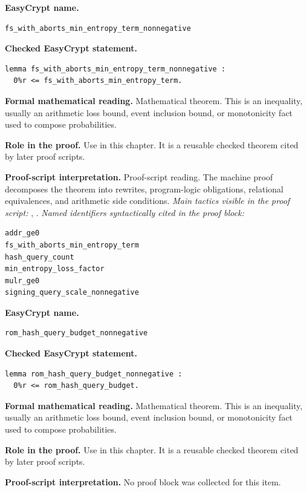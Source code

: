 \begin{formaltheorem}
\noindent\textbf{EasyCrypt name.}
\begin{lstlisting}[language=EasyCrypt,basicstyle=\ttfamily\scriptsize]
fs_with_aborts_min_entropy_term_nonnegative
\end{lstlisting}
\noindent\textbf{Checked EasyCrypt statement.}
\begin{lstlisting}[language=EasyCrypt,basicstyle=\ttfamily\scriptsize]
lemma fs_with_aborts_min_entropy_term_nonnegative :
  0%r <= fs_with_aborts_min_entropy_term.
\end{lstlisting}
\noindent\textbf{Formal mathematical reading.}
Mathematical theorem. This is an inequality, usually an arithmetic loss bound, event inclusion bound, or monotonicity fact used to compose probabilities.

\noindent\textbf{Role in the proof.}
Use in this chapter. It is a reusable checked theorem cited by later proof scripts.

\noindent\textbf{Proof-script interpretation.}
Proof-script reading. The machine proof decomposes the theorem into rewrites, program-logic obligations, relational equivalences, and arithmetic side conditions.
\emph{Main tactics visible in the proof script:} , .
\emph{Named identifiers syntactically cited in the proof block:}
\begin{lstlisting}[language=EasyCrypt,basicstyle=\ttfamily\scriptsize]
addr_ge0
fs_with_aborts_min_entropy_term
hash_query_count
min_entropy_loss_factor
mulr_ge0
signing_query_scale_nonnegative
\end{lstlisting}

\end{formaltheorem}

\begin{formaltheorem}
\noindent\textbf{EasyCrypt name.}
\begin{lstlisting}[language=EasyCrypt,basicstyle=\ttfamily\scriptsize]
rom_hash_query_budget_nonnegative
\end{lstlisting}
\noindent\textbf{Checked EasyCrypt statement.}
\begin{lstlisting}[language=EasyCrypt,basicstyle=\ttfamily\scriptsize]
lemma rom_hash_query_budget_nonnegative :
  0%r <= rom_hash_query_budget.
\end{lstlisting}
\noindent\textbf{Formal mathematical reading.}
Mathematical theorem. This is an inequality, usually an arithmetic loss bound, event inclusion bound, or monotonicity fact used to compose probabilities.

\noindent\textbf{Role in the proof.}
Use in this chapter. It is a reusable checked theorem cited by later proof scripts.

\noindent\textbf{Proof-script interpretation.}
No proof block was collected for this item.

\end{formaltheorem}

